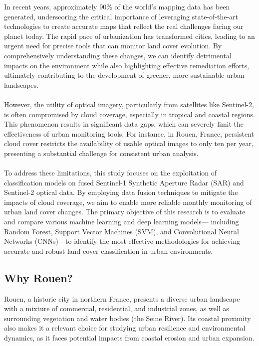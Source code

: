 \documentclass[usenatbib]{tjaa}
\begin{document}
\noindent
In recent years, approximately 90\% of the world's mapping data has been generated,
underscoring the critical importance of leveraging state-of-the-art technologies to create
accurate maps that reflect the real challenges facing our planet today. The rapid pace of
urbanization has transformed cities, leading to an urgent need for precise tools that can
monitor land cover evolution. By comprehensively understanding these changes, we can
identify detrimental impacts on the environment while also highlighting effective remediation
efforts, ultimately contributing to the development of greener, more sustainable urban
landscapes.
\\
\\
However, the utility of optical imagery, particularly from satellites like Sentinel-2, is often
compromised by cloud coverage, especially in tropical and coastal regions. This phenomenon
results in significant data gaps, which can severely limit the effectiveness of urban monitoring
tools. For instance, in Rouen, France, persistent cloud cover restricts the availability of usable
optical images to only ten per year, presenting a substantial challenge for consistent urban
analysis.
\\
\\
To address these limitations, this study focuses on the exploitation of classification models on
fused Sentinel-1 Synthetic Aperture Radar (SAR) and Sentinel-2 optical data. By employing
data fusion techniques to mitigate the impacts of cloud coverage, we aim to enable more
reliable monthly monitoring of urban land cover changes. The primary objective of this
research is to evaluate and compare various machine learning and deep learning models—
including Random Forest, Support Vector Machines (SVM), and Convolutional Neural
Networks (CNNs)—to identify the most effective methodologies for achieving accurate and
robust land cover classification in urban environments.

\subsection{Why Rouen?}
\noindent
Rouen, a historic city in northern France, presents a diverse urban landscape with a mixture of
commercial, residential, and industrial zones, as well as surrounding vegetation and water
bodies (the Seine River). Its coastal proximity also makes it a relevant choice for studying urban
resilience and environmental dynamics, as it faces potential impacts from coastal erosion and
urban expansion.
\end{document}
